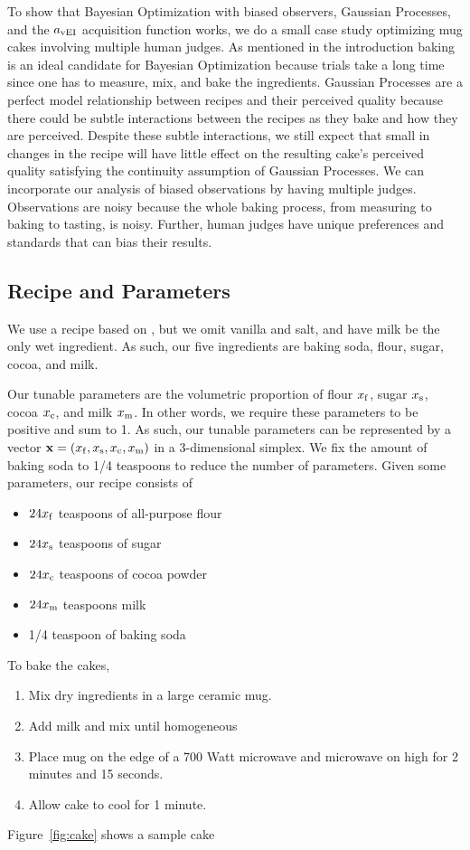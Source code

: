 To show that Bayesian Optimization with biased observers, Gaussian Processes, and the $a_{\vei}$ acquisition function works,
we do a small case study optimizing mug cakes involving multiple human judges.
As mentioned in the introduction
baking is an ideal candidate for Bayesian Optimization because
trials take a long time since one has to measure, mix, and bake the ingredients.
Gaussian Processes are a perfect model relationship between recipes and their perceived quality because there could be subtle interactions between the recipes as they bake and how they are perceived.
Despite these subtle interactions, we still expect that small in changes in the recipe will have little effect on the resulting cake's perceived quality satisfying the continuity assumption of Gaussian Processes.
We can incorporate our analysis of biased observations by having multiple judges.
Observations are noisy because the whole baking process, from measuring to baking to tasting, is noisy.
Further, human judges have unique preferences and standards that can bias their results.

\subsection{Recipe and Parameters}

We use a recipe based on \cite{mugcake}, but we omit vanilla and salt, and have milk be the only wet ingredient.
As such, our five ingredients are baking soda, flour, sugar, cocoa, and milk.

Our tunable parameters are the volumetric proportion of flour $x_\ff$, sugar $x_\ss$, cocoa $x_\cc$, and milk $x_\mm$.
In other words, we require these parameters to be positive and sum to 1.
As such, our tunable parameters can be represented by a vector $\mathbf{x} = (x_\ff, x_\ss, x_\cc,x_\mm)$ in a 3-dimensional simplex.
We fix the amount of baking soda to 1/4 teaspoons to reduce the number of parameters.
Given some parameters, our recipe consists of
\begin{itemize}
    \item $24x_\ff$ teaspoons of all-purpose flour
    \item $24x_\ss$ teaspoons of sugar
    \item $24x_\cc$ teaspoons of cocoa powder
    \item $24x_\mm$ teaspoons milk
    \item 1/4 teaspoon of baking soda
\end{itemize}
To bake the cakes,
\begin{enumerate}
    \item Mix dry ingredients in a large ceramic mug.
    \item Add milk and mix until homogeneous
    \item Place mug on the edge of a 700 Watt microwave and microwave on high for 2 minutes and 15 seconds.
    \item Allow cake to cool for 1 minute.
\end{enumerate}
Figure~\ref{fig:cake} shows a sample cake

